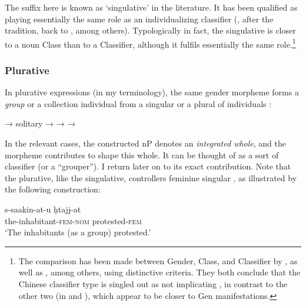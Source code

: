 The suffix  here is known as `singulative' in the literature. It has
been qualified as playing essentially the same role as an individualizing
classifier (\citealt{Greenberg1972}, after the  tradition, back to \citealt{Sibawayhi1938,FassiFehri2004,FassiFehri2012,Mathieu2012,Zabbal2002},
among others). Typologically in fact, the singulative is closer to a noun Class
than to a Classifier, although it fulfils essentially the same
role.\footnote{The comparison has been made between Gender, Class, and
Classifier by \citet{Seifart2010}, as well as \citet{CrismaEtAl2011}, among
others, using distinctive criteria. They both conclude that the Chinese
classifier type is singled out as not implicating , in contrast to the
other two (in  and ), which appear to be closer to Gen
manifestations.}

\subsubsection{Plurative}

In plurative expressions (in my terminology), the same gender morpheme 
forms a \textit{group} or a collection individual from a singular or a plural
of individuals \citep[see][]{FassiFehri1988,FassiFehri2012}:

\begin{exe}
  \ex\label{ex:fassi:7}
  \begin{xlist}
    \ex\label{ex:fassi:7a}  → 
    \ex\label{ex:fassi:7b}  solitary  → 
    \ex\label{ex:fassi:7c}  →  → 
  \end{xlist}
\end{exe}

In the relevant cases, the constructed nP denotes an \textit{integrated whole},
and the morpheme contributes to shape this whole. It can be thought of as a
sort of classifier (or a ``grouper''). I return later on to its exact
contribution. Note that the plurative, like the singulative, controllers
feminine singular , as illustrated by the following construction:

\begin{exe}
  \ex\label{ex:fassi:8}
  \gll s-saakin-at-u \d{h}tajj-at\\
  the-inhabitant-\textsc{fem-nom} protested-\textsc{fem}\\
  \glt `The inhabitants (as a group) protested.'\\
\end{exe}

